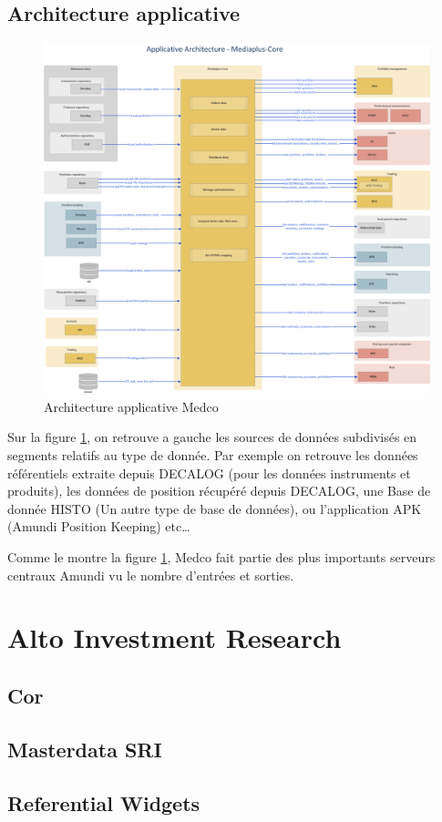 \subsection{Architecture applicative}
\par 
\begin{figure}[ht]
    \centering
    \includegraphics[width=\columnwidth]{img/Architecture Medco.png}
    \caption{Architecture applicative Medco}
    \label{fig:medcoArch}
\end{figure}
\par Sur la figure \ref{fig:medcoArch}, on retrouve a gauche les sources de données subdivisés en segments relatifs au type de donnée. Par exemple on retrouve les données référentiels extraite depuis DECALOG (pour les données instruments et produits), les données de position récupéré depuis DECALOG, une Base de donnée HISTO (Un autre type de base de données), ou l'application APK (Amundi Position Keeping) etc\dots
\par Comme le montre la figure \ref{fig:medcoArch}, Medco fait partie des plus importants serveurs centraux Amundi vu le nombre d'entrées et sorties. 


\section{Alto Investment Research}
\subsection{Cor}
\subsection{Masterdata SRI}
\subsection{Referential Widgets}

